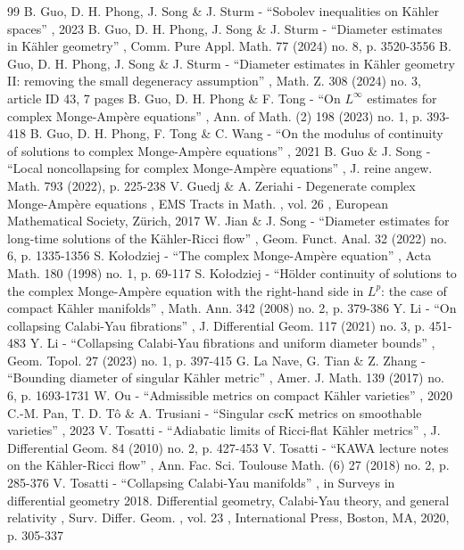 \begin{thebibliography}{99}
 B. Guo, D. H. Phong, J. Song \& J. Sturm - “Sobolev inequalities on Kähler spaces” , 2023
 B. Guo, D. H. Phong, J. Song \& J. Sturm - “Diameter estimates in Kähler geometry” , Comm. Pure Appl. Math. 77 (2024) no. 8, p. 3520-3556
 B. Guo, D. H. Phong, J. Song \& J. Sturm - “Diameter estimates in Kähler geometry II: removing the small degeneracy assumption” , Math. Z. 308 (2024) no. 3, article ID 43, 7 pages
 B. Guo, D. H. Phong \& F. Tong - “On $L^\infty $ estimates for complex Monge-Ampère equations” , Ann. of Math. (2) 198 (2023) no. 1, p. 393-418
 B. Guo, D. H. Phong, F. Tong \& C. Wang - “On the modulus of continuity of solutions to complex Monge-Ampère equations” , 2021
 B. Guo \& J. Song - “Local noncollapsing for complex Monge-Ampère equations” , J. reine angew. Math. 793 (2022), p. 225-238
 V. Guedj \& A. Zeriahi - Degenerate complex Monge-Ampère equations , EMS Tracts in Math. , vol. 26 , European Mathematical Society, Zürich, 2017
 W. Jian \& J. Song - “Diameter estimates for long-time solutions of the Kähler-Ricci flow” , Geom. Funct. Anal. 32 (2022) no. 6, p. 1335-1356
 S. Kołodziej - “The complex Monge-Ampère equation” , Acta Math. 180 (1998) no. 1, p. 69-117
 S. Kołodziej - “Hölder continuity of solutions to the complex Monge-Ampère equation with the right-hand side in $L^p$: the case of compact Kähler manifolds” , Math. Ann. 342 (2008) no. 2, p. 379-386
 Y. Li - “On collapsing Calabi-Yau fibrations” , J. Differential Geom. 117 (2021) no. 3, p. 451-483
 Y. Li - “Collapsing Calabi-Yau fibrations and uniform diameter bounds” , Geom. Topol. 27 (2023) no. 1, p. 397-415
 G. La Nave, G. Tian \& Z. Zhang - “Bounding diameter of singular Kähler metric” , Amer. J. Math. 139 (2017) no. 6, p. 1693-1731
 W. Ou - “Admissible metrics on compact Kähler varieties” , 2020
 C.-M. Pan, T. D. Tô \& A. Trusiani - “Singular cscK metrics on smoothable varieties” , 2023
 V. Tosatti - “Adiabatic limits of Ricci-flat Kähler metrics” , J. Differential Geom. 84 (2010) no. 2, p. 427-453
 V. Tosatti - “KAWA lecture notes on the Kähler-Ricci flow” , Ann. Fac. Sci. Toulouse Math. (6) 27 (2018) no. 2, p. 285-376
 V. Tosatti - “Collapsing Calabi-Yau manifolds” , in Surveys in differential geometry 2018. Differential geometry, Calabi-Yau theory, and general relativity , Surv. Differ. Geom. , vol. 23 , International Press, Boston, MA, 2020, p. 305-337

\end{thebibliography}
